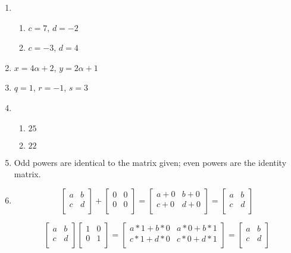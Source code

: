\documentclass[11pt]{article}
\begin{document}
\begin{enumerate}
\item 
\begin{enumerate}
\item $c=7$, $d=-2$
\item $c=-3$, $d=4$
\end{enumerate}


\item $x=4\alpha + 2$, $y=2\alpha + 1$


\item $q=1$, $r=-1$, $s=3$


\item 
\begin{enumerate}
\item $25$
\item $22$
\end{enumerate}




\item Odd powers are identical to the matrix given; even powers are the identity matrix.


\item 
\[
\left[\begin{array}{cc}
a & b \\
c & d \\
\end{array}\right]
+
\left[\begin{array}{cc}
0 & 0 \\
0 & 0 \\
\end{array}\right]
=
\left[\begin{array}{cc}
a+0 & b+0 \\
c+0 & d+0 \\
\end{array}\right]
=
\left[\begin{array}{cc}
a & b \\
c & d \\
\end{array}\right]
\]

\[
\left[\begin{array}{cc}
a & b \\
c & d \\
\end{array}\right]
\left[\begin{array}{cc}
1 & 0 \\
0 & 1 \\
\end{array}\right]
=
\left[\begin{array}{cc}
a*1 + b*0 & a*0 + b*1 \\
c*1 + d*0 & c*0 + d*1 \\
\end{array}\right]
=
\left[\begin{array}{cc}
a & b \\
c & d \\
\end{array}\right]
\]



\end{enumerate}
\end{document}
